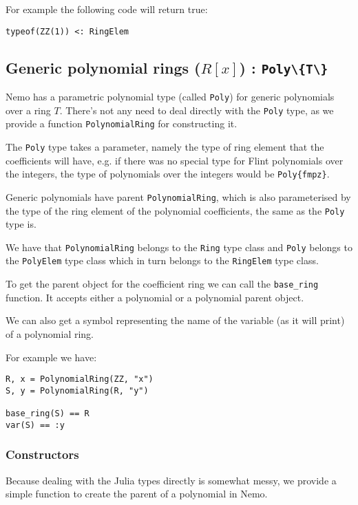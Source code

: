 \documentclass[a4paper,10pt]{article}
\newcommand{\code}{\lstinline}
\begin{document}
For example the following code will return true:

\begin{lstlisting}
typeof(ZZ(1)) <: RingElem
\end{lstlisting}

\subsection{Generic polynomial rings ($R[x]$) : \code|Poly\{T\}|}

Nemo has a parametric polynomial type (called \code{Poly}) for generic polynomials over
a ring $T$. There's not any need to deal directly with the \code{Poly} type, as we
provide a function \code{PolynomialRing} for constructing it.

The \code{Poly} type takes a parameter, namely the type of ring element that the
coefficients will have, e.g. if there was no special type for Flint polynomials over the
integers, the type of polynomials over the integers would be \code|Poly{fmpz}|.

Generic polynomials have parent \code{PolynomialRing}, which is also parameterised by the
type of the ring element of the polynomial coefficients, the same as the \code{Poly}
type is.

We have that \code{PolynomialRing} belongs to the \code{Ring} type class and \code{Poly}
belongs to the \code{PolyElem} type class which in turn belongs to the \code{RingElem}
type class.

To get the parent object for the coefficient ring we can call the \code{base_ring}
function. It accepts either a polynomial or a polynomial parent object.

We can also get a symbol representing the name of the variable (as it will print) of
a polynomial ring.

For example we have:

\begin{lstlisting}
R, x = PolynomialRing(ZZ, "x")
S, y = PolynomialRing(R, "y")

base_ring(S) == R
var(S) == :y
\end{lstlisting}

\subsubsection{Constructors}

Because dealing with the Julia types directly is somewhat messy, we provide a simple
function to create the parent of a polynomial in Nemo.
\end{document}
